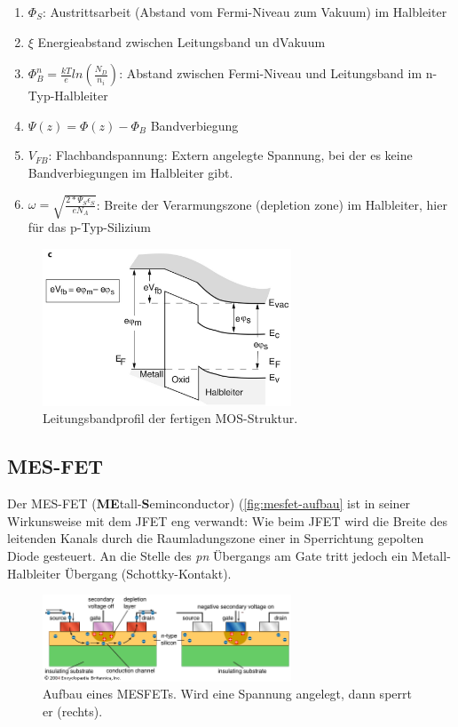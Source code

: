     \begin{enumerate}
        \item $\Phi_S$: Austrittsarbeit (Abstand vom Fermi-Niveau zum Vakuum) im Halbleiter
        \item $\xi$ Energieabstand zwischen Leitungsband un dVakuum
        \item $\Phi_B^n = \frac{kT}{e}ln(\frac{N_D}{n_i})$: Abstand zwischen Fermi-Niveau und Leitungsband im n-Typ-Halbleiter
        \item $\Psi(z) = \Phi(z) - \Phi_B$ Bandverbiegung
        \item $V_{FB}$: Flachbandspannung: Extern angelegte Spannung, bei der es keine Bandverbiegungen im Halbleiter gibt. 
        \item $\omega = \sqrt{\frac{2*\Psi_S \epsilon_S}{eN_A}}$: Breite der Verarmungszone (depletion zone) im Halbleiter, hier für das p-Typ-Silizium
    \end{enumerate}
    
    \begin{figure}
        \centering
        \includegraphics[width=0.66\textwidth]{fig/mos-leitungsband.jpg}
        \caption{Leitungsbandprofil der fertigen MOS-Struktur.}
        \label{fig:mos-bänder}
    \end{figure}
    

\subsection{MES-FET }\label{k6:mesfet}

Der MES-FET (\textbf{ME}tall-\textbf{S}eminconductor) (\autoref{fig:mesfet-aufbau} ist in seiner Wirkunsweise mit dem JFET eng verwandt: Wie beim JFET wird die Breite des leitenden Kanals durch die Raumladungszone einer in Sperrichtung gepolten Diode gesteuert. An die Stelle des \textit{pn} Übergangs am Gate tritt jedoch ein Metall-Halbleiter Übergang (Schottky-Kontakt). 

    \begin{figure}[H]
        \centering
        \includegraphics[width=0.66\textwidth]{fig/mesfet-on-off.png}
        \caption{Aufbau eines MESFETs. Wird eine Spannung angelegt, dann sperrt er (rechts).}
        \label{fig:mesfet-aufbau}
    \end{figure}
    

